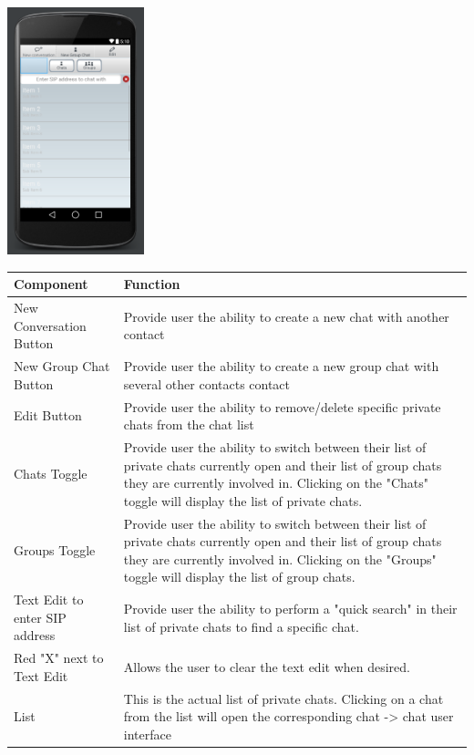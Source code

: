 \documentclass[11pt]{article}
\begin{document}
\includegraphics[width=150px]{images/Chatlist.png}
\newpage
\begin{table}[h]
\begin{tabular}{ll}
\textbf{Component}  & \textbf{Function}       
\\ \hline
\multicolumn{1}{|L{5cm}|}{New Conversation Button} & \multicolumn{1}{L{8cm}|}{Provide user the ability to create a new chat with another contact}
\\ \hline
\multicolumn{1}{|L{5cm}|}{New Group Chat Button} & \multicolumn{1}{L{8cm}|}{Provide user the ability to create a new group chat with several other contacts contact}
\\ \hline
\multicolumn{1}{|L{5cm}|}{Edit Button} & \multicolumn{1}{L{8cm}|}{Provide user the ability to remove/delete specific private chats from the chat list}
\\ \hline
\multicolumn{1}{|L{5cm}|}{Chats Toggle} & \multicolumn{1}{L{8cm}|}{Provide user the ability to switch between their list of private chats currently open and their list of group chats they are currently involved in. Clicking on the "Chats" toggle will display the list of private chats.}
\\ \hline
\multicolumn{1}{|L{5cm}|}{Groups Toggle} & \multicolumn{1}{L{8cm}|}{Provide user the ability to switch between their list of private chats currently open and their list of group chats they are currently involved in. Clicking on the "Groups" toggle will display the list of group chats.}
\\ \hline
\multicolumn{1}{|L{5cm}|}{Text Edit to enter SIP address} & \multicolumn{1}{L{8cm}|}{Provide user the ability to perform a "quick search" in their list of private chats to find a specific chat.}
\\ \hline
\multicolumn{1}{|L{5cm}|}{Red "X" next to Text Edit} & \multicolumn{1}{L{8cm}|}{Allows the user to clear the text edit when desired.}
\\ \hline
\multicolumn{1}{|L{5cm}|}{List} & \multicolumn{1}{L{8cm}|}{This is the actual list of private chats. Clicking on a chat from the list will open the corresponding chat -> chat user interface}
\\ \hline

\end{tabular}
\end{table}
\end{document}
